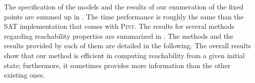 The specification of the models and the results of our enumeration of the fixed points
are summed up in .
The time performance is roughly the same than the SAT implementation
that comes with \textsc{Pint}.
The results for several methods regarding reachability properties
are summarized in .
The methods and the results provided by each of them are detailed in the following.
The overall results show that our method is efficient in computing reachability
from a given initial state;
furthermore, it sometimes provides more information than the other existing ones.


